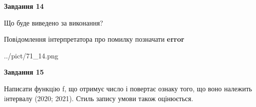\documentclass[11pt, ukrainian]{article}
\begin{document}
{\begin {large}
{\begin {center}\textbf{Завдання 14}\end {center}}\par
Що буде виведено за виконання? \par
Повідомлення інтерпретатора про помилку позначати \textbf{error}

\begin{center}
	{../pict/71_14.png}
\end{center}
\newpage

{\begin {center}\textbf{Завдання 15}\end {center}}\par

Написати функцiю f, що отримує число і повертає ознаку того, що воно належить iнтервалу (2020; 2021). Стиль запису умови також оцінюється.\par
\newpage

\end {large}}
\end{document}
